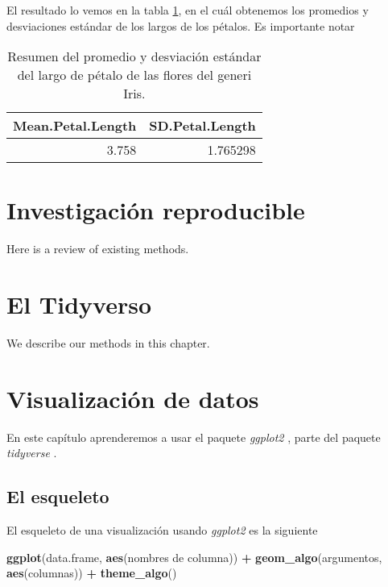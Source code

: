\documentclass[]{book}
\newenvironment{Shaded}{\begin{snugshade}}{\end{snugshade}}
\newcommand{\KeywordTok}[1]{\textcolor[rgb]{0.13,0.29,0.53}{\textbf{#1}}}
\newcommand{\NormalTok}[1]{#1}
\newcommand{\OperatorTok}[1]{\textcolor[rgb]{0.81,0.36,0.00}{\textbf{#1}}}
\newcommand{\StringTok}[1]{\textcolor[rgb]{0.31,0.60,0.02}{#1}}
\begin{document}
El resultado lo vemos en la tabla \ref{tab:SummaryPetaltab}, en el cuál
obtenemos los promedios y desviaciones estándar de los largos de los
pétalos. Es importante notar

\begin{table}

\caption{\label{tab:SummaryPetaltab}Resumen del promedio y desviación estándar del largo de pétalo de las flores del generi Iris.}
\centering
\begin{tabular}[t]{rr}
\toprule
Mean.Petal.Length & SD.Petal.Length\\
\midrule
3.758 & 1.765298\\
\bottomrule
\end{tabular}
\end{table}

\hypertarget{reproducible}{%
\chapter{Investigación reproducible}\label{reproducible}}

Here is a review of existing methods.

\hypertarget{tidyverso}{%
\chapter{El Tidyverso}\label{tidyverso}}

We describe our methods in this chapter.

\hypertarget{visualizacion}{%
\chapter{Visualización de datos}\label{visualizacion}}

En este capítulo aprenderemos a usar el paquete \emph{ggplot2}
\citep{Wickhamggplot}, parte del paquete \emph{tidyverse}
\citep{Wickhamtidyverse}.

\hypertarget{el-esqueleto}{%
\section{El esqueleto}\label{el-esqueleto}}

El esqueleto de una visualización usando \emph{ggplot2} es la siguiente

\begin{Shaded}
\begin{Highlighting}[]
\KeywordTok{ggplot}\NormalTok{(data.frame, }\KeywordTok{aes}\NormalTok{(nombres de columna)) }\OperatorTok{+}\StringTok{ }\KeywordTok{geom_algo}\NormalTok{(argumentos, }\KeywordTok{aes}\NormalTok{(columnas)) }\OperatorTok{+}\StringTok{ }\KeywordTok{theme_algo}\NormalTok{()}
\end{Highlighting}
\end{Shaded}
\end{document}
